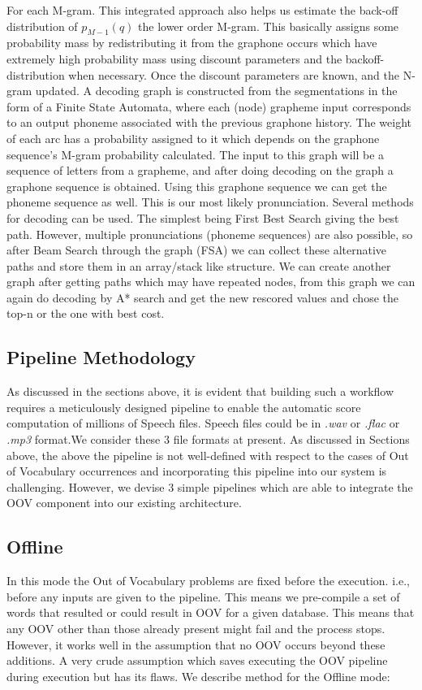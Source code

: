 \documentclass[letterpaper,12pt]{article}
\begin{document}
For each M-gram. This integrated approach also helps us estimate the back-off distribution of $p_{M-1}(q)$ the lower order M-gram. This basically assigns some probability mass by 
redistributing it from the graphone occurs which have extremely high probability mass using 
discount parameters and the backoff-distribution when necessary.
Once the discount parameters are known, and the N-gram updated. A decoding graph is 
constructed from the segmentations in the form of a Finite State Automata, where each (node) 
grapheme input corresponds to an output phoneme associated with the previous graphone 
history. The weight of each arc has a probability assigned to it which depends on the graphone 
sequence’s M-gram probability calculated. The input to this graph will be a sequence of 
letters from a grapheme, and after doing decoding on the graph a graphone sequence is 
obtained. Using this graphone sequence we can get the phoneme sequence as well. This is our 
most likely pronunciation. Several methods for decoding can be used. The simplest being 
First Best Search giving the best path. However, multiple pronunciations (phoneme 
sequences) are also possible, so after Beam Search through the graph (FSA) we can collect 
these alternative paths and store them in an array/stack like structure. We can create another 
graph after getting paths which may have repeated nodes, from this graph we can again do 
decoding by A* search and get the new rescored values and chose the top-n or the one with 
best cost.



\subsection{Pipeline Methodology}

As discussed in the sections above, it is evident that building such a workflow requires a 
meticulously designed pipeline to enable the automatic score computation of millions of 
Speech files. Speech files could be in \emph{.wav} or \emph{.flac} or \emph{.mp3} format.We consider these 3 file 
formats at present. As discussed in Sections above, the above the pipeline is not well-defined with respect to the cases of Out of Vocabulary occurrences and incorporating this pipeline 
into our system is challenging. However, we devise 3 simple pipelines which are able to integrate the OOV component into our existing architecture.
\pagebreak
\subsection{Offline}
In this mode the Out of Vocabulary problems are fixed before the execution. i.e., before any 
inputs are given to the pipeline. This means we pre-compile a set of words that resulted or 
could result in OOV for a given database. This means that any OOV other than those already 
present might fail and the process stops. However, it works well in the assumption that no 
OOV occurs beyond these additions. A very crude assumption which saves executing the 
OOV pipeline during execution but has its flaws. We describe method for the Offline mode:
\end{document}
